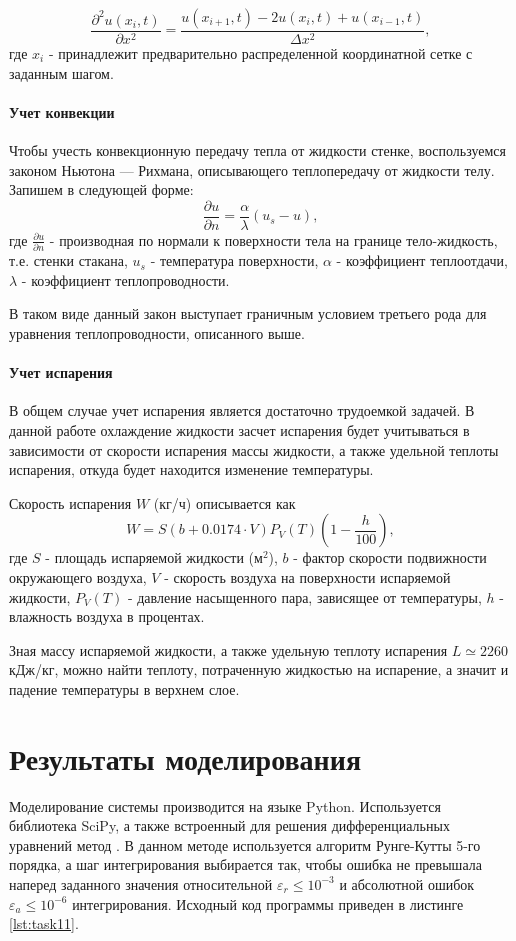 \begin{equation}
	\frac{\partial^2 u(x_i,t)}{\partial x^2} = \frac{u(x_{i+1},t) -2 u(x_{i},t) + u(x_{i-1},t)}{\Delta x^2},
\end{equation}
где $x_i$ - принадлежит предварительно распределенной координатной сетке с заданным шагом.

\paragraph{Учет конвекции} Чтобы учесть конвекционную передачу тепла от жидкости стенке, воспользуемся законом 
Ньютона — Рихмана, описывающего теплопередачу от жидкости телу. Запишем в следующей форме:
\begin{equation}
	\frac{\partial u}{\partial n} = \frac{\alpha}{\lambda}(u_s - u),
\end{equation}
где $\frac{\partial u}{\partial n}$ - производная по нормали к поверхности тела на границе тело-жидкость, т.е. стенки стакана, $u_s$ - 
температура поверхности, $\alpha$ - коэффициент теплоотдачи, $\lambda$ - коэффициент теплопроводности.

В таком виде данный закон выступает граничным условием третьего рода для уравнения теплопроводности, описанного выше.

\paragraph{Учет испарения} В общем случае учет испарения является достаточно трудоемкой задачей. В данной работе охлаждение жидкости засчет
испарения будет учитываться в зависимости от скорости испарения массы жидкости, а также удельной теплоты испарения, откуда будет находится изменение температуры.

Скорость испарения $W$ (кг/ч) описывается как
\begin{equation}
	W = S (b + 0.0174 \cdot V) P_V(T) (1 - \frac{h}{100}),
\end{equation}
где $S$ - площадь испаряемой жидкости (м$^2$), $b$ - фактор скорости подвижности окружающего воздуха, $V$ - скорость воздуха на поверхности испаряемой жидкости,
$P_V(T)$ - давление насыщенного пара, зависящее от температуры, $h$ - влажность воздуха в процентах.

Зная массу испаряемой жидкости, а также удельную теплоту испарения $L \simeq 2260 $ кДж/кг, можно найти теплоту, потраченную жидкостью на испарение,
а значит и падение температуры в верхнем слое.


\section{Результаты моделирования}
Моделирование системы производится на языке Python.
Используется библиотека SciPy, а также встроенный для решения дифференциальных уравнений метод .
В данном методе используется алгоритм Рунге-Кутты 5-го порядка, а шаг интегрирования выбирается так,
чтобы ошибка не превышала наперед заданного значения относительной $\varepsilon_r \leq 10^{-3}$ и абсолютной
ошибок $\varepsilon_a \leq 10^{-6}$ интегрирования.
Исходный код программы приведен в листинге \ref{lst:task11}.

